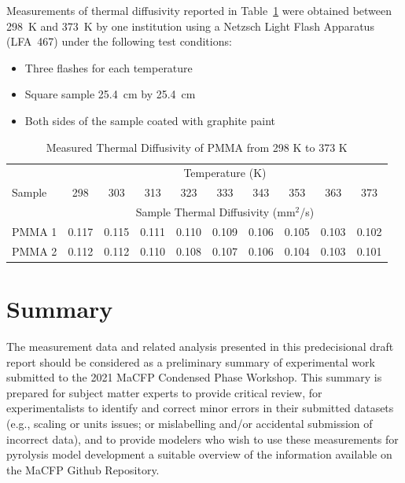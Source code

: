 \documentclass{book}
\begin{document}
Measurements of thermal diffusivity reported in Table~\ref{Table_15} were obtained between 298~K and 373~K by one institution using a Netzsch Light Flash Apparatus (LFA~467) under the following test conditions:
\begin{itemize}
 \item Three flashes for each temperature
 \item Square sample 25.4~cm by 25.4~cm
 \item Both sides of the sample coated with graphite paint
\end{itemize}

\begin{table}[ht]
\caption{Measured Thermal Diffusivity of PMMA from 298 K to 373 K}
\label{Table_15}
\begin{center}
\begin{tabular}{|l|ccccccccc|}
\hline
        & \multicolumn{9}{|c|}{Temperature (K)}                                 \\ \cline{2-10}
Sample  & 298  & 303  & 313  & 323  & 333  & 343  & 353  & 363  & 373           \\ \cline{2-10}
        & \multicolumn{9}{|c|}{Sample Thermal Diffusivity (mm$^2$/s)}           \\ \hline
PMMA 1  & 0.117 & 0.115 & 0.111 & 0.110 & 0.109 & 0.106 & 0.105 & 0.103 & 0.102 \\
PMMA 2  & 0.112 & 0.112 & 0.110 & 0.108 & 0.107 & 0.106 & 0.104 & 0.103 & 0.101 \\ \hline
\end{tabular}
\end{center}
\end{table}

\chapter{Summary}
\label{Summary}
The measurement data and related analysis presented in this predecisional draft report should be considered as a preliminary summary of experimental work submitted to the 2021 MaCFP Condensed Phase Workshop. This summary is prepared for subject matter experts to provide critical review, for experimentalists to identify and correct minor errors in their submitted datasets (e.g., scaling or units issues; or mislabelling and/or accidental submission of incorrect data), and to provide modelers who wish to use these measurements for pyrolysis model development a suitable overview of the information available on the MaCFP Github Repository.
\end{document}

